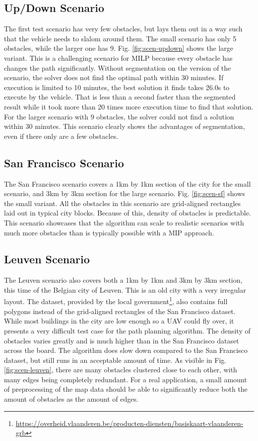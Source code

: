 \subsection{Up/Down Scenario}
The first test scenario has very few obstacles, but lays them out in a way such that the vehicle needs to slalom around them. The small scenario has only 5 obstacles, while the larger one has 9. Fig. \ref{fig:scen-updown} shows the large variant. This is a challenging scenario for MILP because every obstacle has changes the path significantly. Without segmentation on the version of the scenario, the solver does not find the optimal path within 30 minutes. If execution is limited to 10 minutes, the best solution it finds takes 26.0s to execute by the vehicle. That is less than a second faster than the segmented result while it took more than 20 times more execution time to find that solution. For the larger scenario with 9 obstacles, the solver could not find a solution within 30 minutes. This scenario clearly shows the advantages of segmentation, even if there only are a few obstacles.

\subsection{San Francisco Scenario}
The San Francisco scenario covers a 1km by 1km section of the city for the small scenario, and 3km by 3km section for the large scenario. Fig. \ref{fig:scen-sf} shows the small variant. All the obstacles in this scenario are grid-aligned rectangles laid out in typical city blocks. Because of this, density of obstacles is predictable. This scenario showcases that the algorithm can scale to realistic scenarios with much more obstacles than is typically possible with a MIP approach. 

\subsection{Leuven Scenario}
The Leuven scenario also covers both a 1km by 1km and 3km by 3km section, this time of the Belgian city of Leuven. This is an old city with a very irregular layout. The dataset, provided by the local government\footnote{\url{https://overheid.vlaanderen.be/producten-diensten/basiskaart-vlaanderen-grb}}, also contains full polygons instead of the grid-aligned rectangles of the San Francisco dataset. While most buildings in the city are low enough so a UAV could fly over, it presents a very difficult test case for the path planning algorithm. The density of obstacles varies greatly and is much higher than in the San Francisco dataset across the board. The algorithm does slow down compared to the San Francisco dataset, but still runs in an acceptable amount of time. As visible in Fig. \ref{fig:scen-leuven}, there are many obstacles clustered close to each other, with many edges being completely redundant. For a real application, a small amount of preprocessing of the map data should be able to significantly reduce both the amount of obstacles as the amount of edges. 





